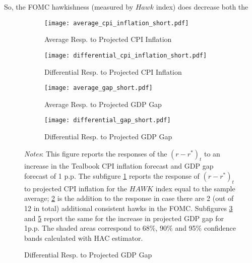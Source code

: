 \documentclass[11pt]{article}
\begin{document}
So, the FOMC hawkishness (measured by $\mathit{Hawk}$ index) does decrease both the 


\begin{figure}[!htbp]\centering
  \begin{minipage}{1\textwidth}
    \caption{Policy Response to Inflation and FOMC Hawkishness. Short Specification}\vspace{2ex}
    \label{fig:LP_short}
    \begin{subfigure}[b]{0.495\textwidth}
        \centering
        \caption{Average Resp. to Projected CPI Inflation}
        \label{fig:LP_short:average_inflation}
        \texttt{[image: average\_cpi\_inflation\_short.pdf]}
    \end{subfigure}
    \hfill
    \begin{subfigure}[b]{0.495\textwidth}
        \centering
        \caption{Differential  Resp. to Projected CPI Inflation}
        \label{fig:LP_short:differential_inflation}
        \texttt{[image: differential\_cpi\_inflation\_short.pdf]}
    \end{subfigure}\vspace{2ex}
    \begin{subfigure}[b]{0.495\textwidth}\centering
      \caption{Average Resp. to Projected GDP Gap}
      \label{fig:LP_short:average_gap}
      \texttt{[image: average\_gap\_short.pdf]}
    \end{subfigure} \hfill
    \begin{subfigure}[b]{0.495\textwidth}\centering
      \caption{Differential Resp. to Projected GDP Gap}
      \label{fig:LP_short:differential_gap}
      \texttt{[image: differential\_gap\_short.pdf]}
    \end{subfigure}
        {\begin{flushleft}\scriptsize\textit{Notes}: This figure reports the responses of the $(r-r^*)_t$ to an increase in the Tealbook CPI inflation forecast and GDP gap forecast of 1 p.p. The subfigure \ref{fig:LP_short:average_inflation} reports the response of $(r-r^*)_t$ to projected CPI inflation for the $\mathit{HAWK}$ index equal to the sample average; \ref{fig:LP_short:differential_inflation} is the addition to the response in case there are 2 (out of 12 in total) additional consistent hawks in the FOMC. Subfigures \ref{fig:LP_short:average_gap} and \ref{fig:LP_short:differential_gap} report the same for the increase in projected GDP gap for 1p.p. The shaded areas correspond to 68\%, 90\% and 95\% confidence bands calculated with \citet{Andrews1991} HAC estimator.\end{flushleft}}
            
  \end{minipage}
\end{figure}
\end{document}

